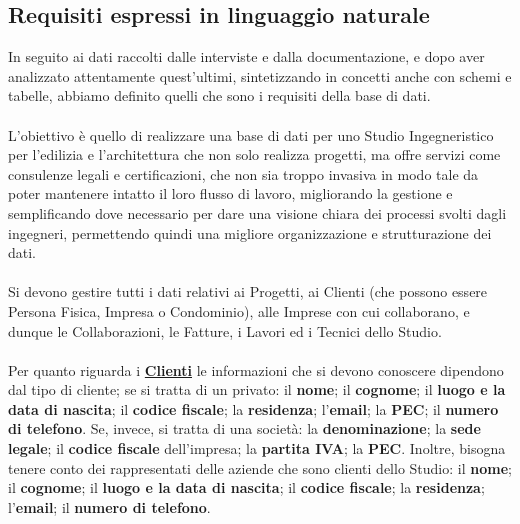 \documentclass{elegantbook}
\begin{document}
	\subsection{Requisiti espressi in linguaggio naturale}
	
	In seguito ai dati raccolti dalle interviste e dalla documentazione, e dopo aver analizzato attentamente quest'ultimi,
        sintetizzando in concetti anche con schemi e tabelle, abbiamo definito quelli che sono i requisiti della base di dati.
	\\\\
	
	L'obiettivo è quello di realizzare una base di dati per uno Studio Ingegneristico per l'edilizia e l'architettura che 
        non solo realizza progetti, ma offre servizi come consulenze legali e certificazioni, che non sia troppo invasiva in 
        modo tale da poter mantenere intatto il loro flusso di lavoro, migliorando la gestione e semplificando dove necessario
        per dare una visione chiara dei processi svolti dagli ingegneri, permettendo quindi una migliore organizzazione e strutturazione dei dati.
	\\\\
	
	Si devono gestire tutti i dati relativi ai Progetti, ai Clienti (che possono essere Persona Fisica, Impresa o Condominio), alle
        Imprese con cui collaborano, e dunque le Collaborazioni, le Fatture, i Lavori ed i Tecnici dello Studio.
	\\\\
	
	Per quanto riguarda i \underline{\textbf{Clienti}} le informazioni che si devono conoscere dipendono dal tipo di cliente;
        se si tratta di un privato: il \textbf{nome}; il \textbf{cognome}; il \textbf{luogo e la data di nascita};
        il \textbf{codice fiscale}; la \textbf{residenza}; l'\textbf{email}; la \textbf{PEC}; il \textbf{numero di telefono}. Se, invece, si
        tratta di una società: la \textbf{denominazione}; la \textbf{sede legale}; il \textbf{codice fiscale} dell'impresa; la
        \textbf{partita IVA}; la \textbf{PEC}. Inoltre, bisogna tenere conto dei rappresentati delle aziende che sono clienti
        dello Studio: il \textbf{nome}; il \textbf{cognome}; il \textbf{luogo e la data di nascita}; il \textbf{codice fiscale};
        la \textbf{residenza}; l'\textbf{email}; il \textbf{numero di telefono}.
	\\\\
	
\end{document}
